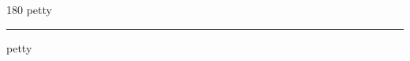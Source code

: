 
\begin{frame}
\begin{center}
\begin{turn}{180}
{\fontsize{2.5cm}{1em}\selectfont petty}
\end{turn}
\vspace{1em}\par  
\hrule
\vspace{1em}\par  
{\fontsize{2.5cm}{1em}\selectfont petty}
\end{center}
\end{frame}
